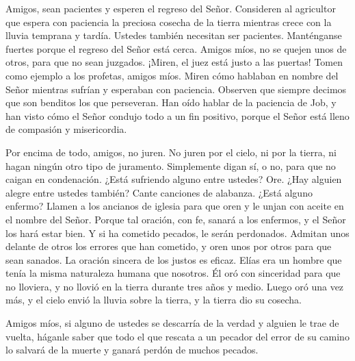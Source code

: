  Amigos, sean pacientes y esperen el regreso del Señor.
Consideren al agricultor que espera con paciencia la preciosa cosecha de
la tierra mientras crece con la lluvia temprana y tardía. 
Ustedes también necesitan ser pacientes. Manténganse fuertes porque el
regreso del Señor está cerca.  Amigos míos, no se quejen
unos de otros, para que no sean juzgados. ¡Miren, el juez está justo a
las puertas!  Tomen como ejemplo a los profetas, amigos
míos. Miren cómo hablaban en nombre del Señor mientras sufrían y
esperaban con paciencia.  Observen que siempre decimos que
son benditos los que perseveran. Han oído hablar de la paciencia de Job,
y han visto cómo el Señor condujo todo a un fin positivo, porque el
Señor está lleno de compasión y misericordia.

 Por encima de todo, amigos, no juren. No juren por el
cielo, ni por la tierra, ni hagan ningún otro tipo de juramento.
Simplemente digan sí, o no, para que no caigan en condenación.
 ¿Está sufriendo alguno entre ustedes? Ore. ¿Hay alguien
alegre entre ustedes también? Cante canciones de alabanza. 
¿Está alguno enfermo? Llamen a los ancianos de iglesia para que oren y
le unjan con aceite en el nombre del Señor.  Porque tal
oración, con fe, sanará a los enfermos, y el Señor los hará estar bien.
Y si ha cometido pecados, le serán perdonados.  Admitan
unos delante de otros los errores que han cometido, y oren unos por
otros para que sean sanados. La oración sincera de los justos es eficaz.
 Elías era un hombre que tenía la misma naturaleza humana
que nosotros. Él oró con sinceridad para que no lloviera, y no llovió en
la tierra durante tres años y medio.  Luego oró una vez
más, y el cielo envió la lluvia sobre la tierra, y la tierra dio su
cosecha.

 Amigos míos, si alguno de ustedes se descarría de la
verdad y alguien le trae de vuelta,  háganle saber que todo
el que rescata a un pecador del error de su camino lo salvará de la
muerte y ganará perdón de muchos pecados.
